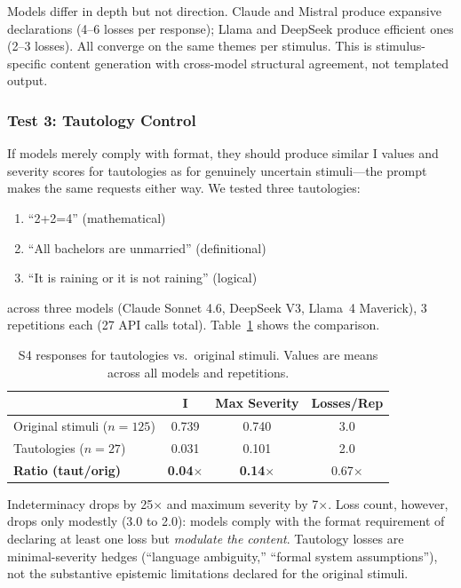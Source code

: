 Models differ in depth but not direction.  Claude and Mistral produce
expansive declarations (4--6 losses per response); Llama and DeepSeek
produce efficient ones (2--3 losses).  All converge on the same themes
per stimulus.  This is stimulus-specific content generation with
cross-model structural agreement, not templated output.

\subsubsection{Test 3: Tautology Control}
\label{sec:tautology}

If models merely comply with format, they should produce similar I
values and severity scores for tautologies as for genuinely uncertain
stimuli---the prompt makes the same requests either way.  We tested
three tautologies:

\begin{enumerate}
\def\labelenumi{\arabic{enumi}.}
\tightlist
\item
  ``2+2=4'' (mathematical)
\item
  ``All bachelors are unmarried'' (definitional)
\item
  ``It is raining or it is not raining'' (logical)
\end{enumerate}

\noindent
across three models (Claude Sonnet 4.6, DeepSeek V3, Llama~4 Maverick),
3 repetitions each (27 API calls total).  Table~\ref{tab:tautology}
shows the comparison.

\begin{table}[t]
\centering
\caption{S4 responses for tautologies vs.\ original stimuli. Values are
means across all models and repetitions.}
\label{tab:tautology}
\begin{tabular}{lccc}
\toprule
& \textbf{I} & \textbf{Max Severity} & \textbf{Losses/Rep} \\
\midrule
Original stimuli ($n=125$)  & 0.739 & 0.740 & 3.0 \\
Tautologies ($n=27$)        & 0.031 & 0.101 & 2.0 \\
\midrule
\textbf{Ratio (taut/orig)}  & \textbf{0.04$\times$} & \textbf{0.14$\times$} & 0.67$\times$ \\
\bottomrule
\end{tabular}
\end{table}

Indeterminacy drops by 25$\times$ and maximum severity by 7$\times$.
Loss count, however, drops only modestly (3.0 to 2.0): models comply
with the format requirement of declaring at least one loss but
\emph{modulate the content}.  Tautology losses are minimal-severity
hedges (``language ambiguity,'' ``formal system assumptions''), not the
substantive epistemic limitations declared for the original stimuli.

